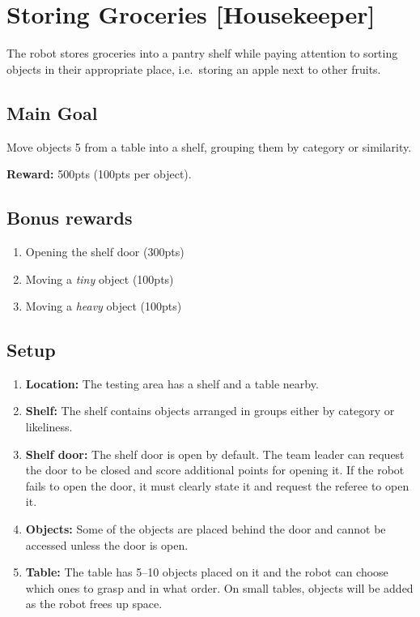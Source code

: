 \section{Storing Groceries [Housekeeper]}
The robot stores groceries into a pantry shelf while paying attention to sorting objects in their appropriate place, i.e.~storing an apple next to other fruits.


\subsection{Main Goal}
Move objects 5 from a table into a shelf, grouping them by category or similarity.

\noindent\textbf{Reward:} 500pts (100pts per object).\\

\subsection{Bonus rewards}
\begin{enumerate}[nosep]
	\item Opening the shelf door (300pts)
	\item Moving a \emph{tiny} object (100pts)
	\item Moving a \emph{heavy} object (100pts)
\end{enumerate}

%
%
\subsection{Setup}
\begin{enumerate}
	\item \textbf{Location:} The testing area has a shelf and a table nearby.

	\item \textbf{Shelf:} The shelf contains objects arranged in groups either by category or likeliness.

	\item \textbf{Shelf door:} The shelf door is open by default.
	The team leader can request the door to be closed and score additional points for opening it. If the robot fails to open the door, it must clearly state it and request the referee to open it.

	\item \textbf{Objects:} Some of the objects are placed behind the door and cannot be accessed unless the door is open.

	\item \textbf{Table:} The table has 5--10 objects placed on it and the robot can choose which ones to grasp and in what order. On small tables, objects will be added as the robot frees up space.
\end{enumerate}


